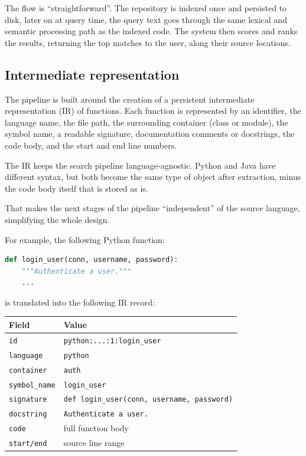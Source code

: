 \documentclass[12pt]{article}
\begin{document}
The flow is ``straightforward''.
The repository is indexed once and persisted to disk, later on at query time, the query text goes through the
same lexical and semantic processing path as the indexed code.
The system then scores and ranks the results, returning the top matches to the user, along their source locations.

\subsection{Intermediate representation}
\label{subsec:ir}

The pipeline is built around the creation of a persistent intermediate representation (IR) of functions.
Each function is represented by an identifier, the language name, the file path, the surrounding container (class or module),
the symbol name, a readable signature, documentation comments or docstrings, the code body, and the start and end line numbers.

The IR keeps the search pipeline language-agnostic.
Python and Java have different syntax, but both become the same type of object after extraction, minus the code body itself that is stored as is.

That makes the next stages of the pipeline ``independent'' of the source language, simplifying the whole design.

For example, the following Python function:

\begin{lstlisting}[language=Python]
def login_user(conn, username, password):
    """Authenticate a user."""
    ...
\end{lstlisting}

is translated into the following IR record:

\begin{center}
  \small
  \setlength{\tabcolsep}{4pt}
  \begin{tabularx}{\linewidth}{>{\raggedright\arraybackslash}p{1.25in} >{\raggedright\arraybackslash}X}
    \toprule
    Field & Value \\
    \midrule
    \texttt{id} & \texttt{python:...:1:login\_user} \\
    \texttt{language} & \texttt{python} \\
    \texttt{container} & \texttt{auth} \\
    \texttt{symbol\_name} & \texttt{login\_user} \\
    \texttt{signature} & \texttt{def login\_user(conn, username, password)} \\
    \texttt{docstring} & \texttt{Authenticate a user.} \\
    \texttt{code} & full function body \\
    \texttt{start/end} & source line range \\
    \bottomrule
  \end{tabularx}
  \normalsize
\end{center}
\end{document}

